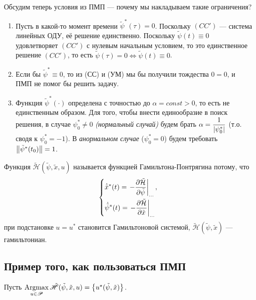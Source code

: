 Обсудим теперь условия из ПМП --- почему  мы накладываем такие ограничения?
\begin{enumerate}
    \item Пусть в какой-то момент времени $\tilde{\psi}^*(\tau) = 0$. Поскольку $(CC')$ --- система линейных ОДУ, её решение единственно. Поскольку $\tilde{\psi}(t) \equiv 0$ удовлетворяет $(CC')$ с нулевым начальным условием, то это единственное решение $(CC')$, то есть $\tilde{\psi}(\tau) = 0 \Leftrightarrow \tilde{\psi}(t) \equiv 0$.
    \item Если бы $\tilde{\psi}^* \equiv 0$, то из (СС) и (УМ) мы бы получили тождества $0 = 0$, и  ПМП не помог бы решить задачу.
    \item Функция $\tilde{\psi}^*(\cdot)$ определена с точностью до $\alpha = const > 0$, то есть не единственным образом. Для того, чтобы внести единообразие в поиск решения, в случае $\psi_0^* \neq 0$ \textit{(нормальный случай)} будем брать $\alpha = \dfrac{1}{\left\lvert \psi_0^* \right\rvert}$ (т.о. сводя к $\psi_0^* = -1$). В \textit{анормальном случае} ($\psi_0^* = 0$) будем требовать $\left\lVert \tilde{\psi}^*(t_0) \right\rVert = 1$.
\end{enumerate}

\begin{remark}
    Функция $\tilde{\mathcal{H}}(\tilde{\psi}, \tilde{x}, u)$ называется функцией Гамильтона-Понтрягина потому, что
    $$
        \left\{
            \begin{aligned}
                & \dot{\tilde{x}}^*(t) = \left. -\dfrac{\partial \tilde{\mathcal{H}}}{\partial \tilde{\psi}} \right|_{\ldots},\\
                & \dot{\tilde{\psi}}^*(t) = \left. -\dfrac{\partial \tilde{\mathcal{H}}}{\partial \tilde{x}} \right|_{\ldots}
            \end{aligned}
        \right.
    $$
    при подстановке $u = u^*$ становится Гамильтоновой системой, $\tilde{\mathscr{H}}(\tilde{\psi}, \tilde{x})$ --- гамильтониан.
\end{remark}

\subsection*{Пример того, как пользоваться ПМП}
Пусть $\operatorname*{\mathrm{Argmax}}\limits_{u \in \mathscr{P}} \tilde{\mathscr{H}}(\tilde{\psi}, \tilde{x}, u) = \left\{u^{\star}(\tilde{\psi}, \tilde{x})\right\}$.

